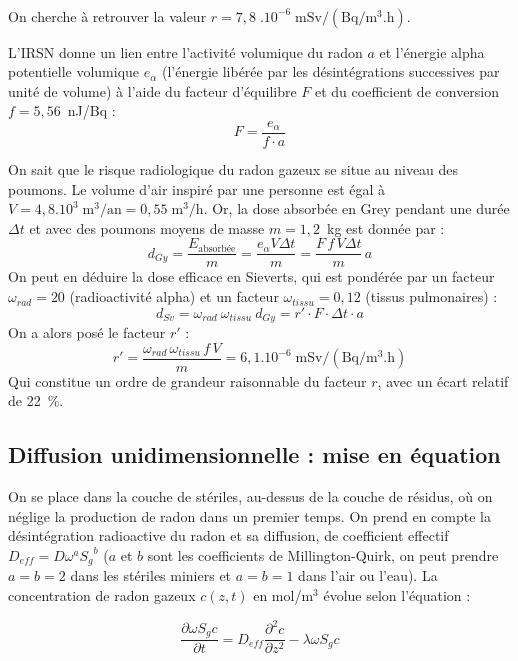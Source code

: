 \documentclass{article}
\begin{document}
\paragraph{} On cherche à retrouver la valeur $r=7,8 \; .10^{-6} \;\text{m}\text{Sv}/(\text{Bq}/\text{m}^3.\text{h})$.

L’IRSN donne un lien \cite{irsn_ineris_radon_nodate} entre l’activité volumique du radon $a$ et l’énergie alpha potentielle volumique $e_{\alpha}$ (l’énergie libérée par les désintégrations successives par unité de volume) à l’aide du facteur d’équilibre $F$ et du coefficient de conversion $f=5,56$~nJ/Bq :
$$
F=\frac{e_{\alpha}}{f\cdot a}
$$

On sait que le risque radiologique du radon gazeux se situe au niveau des poumons. Le volume d’air inspiré par une personne est égal à $V=4,8.10^3 \;  \text{m}^3/\text{an}=0,55 \; \text{m}^3/\text{h}$. Or, la dose absorbée en Grey pendant une durée $\Delta t$ et avec des poumons moyens de masse $m=1,2$~kg est donnée par : 
$$
d_{Gy}=\frac{E_{\text{absorbée}}}{m}=\frac{e_{\alpha} V \Delta t}{m}=\frac{F\,f\,V\Delta t}{m}\,a
$$
On peut en déduire la dose efficace en Sieverts, qui est pondérée par un facteur $\omega_{rad}=20$ (radioactivité alpha) et un facteur $\omega_{tissu}=0,12$ (tissus pulmonaires) :
$$
d_{Sv}=\omega_{rad}\: \omega_{tissu} \: d_{Gy} = r'\cdot F\cdot\Delta t\cdot a
$$
On a alors posé le facteur $r'$ :
$$
r'= \frac{\omega_{rad}\, \omega_{tissu}\,  f\,V}{m}=6,1.10^{-6} \; \text{m}\text{Sv}/(\text{Bq}/\text{m}^3.\text{h})
$$
Qui constitue un ordre de grandeur raisonnable du facteur $r$, avec un écart relatif de 22~\%.

\subsection{Diffusion unidimensionnelle : mise en équation}
\label{annexe:equation}

On se place dans la couche de stériles, au-dessus de la couche de résidus, où on néglige la production de radon dans un premier temps. On prend en compte la désintégration radioactive du radon et sa diffusion, de coefficient effectif $D_{eff}=D \omega^a {S_g}^b$ ($a$ et $b$ sont les coefficients de Millington-Quirk, on peut prendre $a=b=2$ dans les stériles miniers et $a=b=1$ dans l’air ou l’eau). La concentration de radon gazeux $c(z,t)$ en mol/m$^3$ évolue selon l’équation \cite{ferry_migration_2000} :

$$
\frac{\partial \omega S_g c}{\partial t} = D_{eff}  \frac{\partial^2 c}{\partial z^2}-\lambda \omega S_g c
$$
\end{document}
